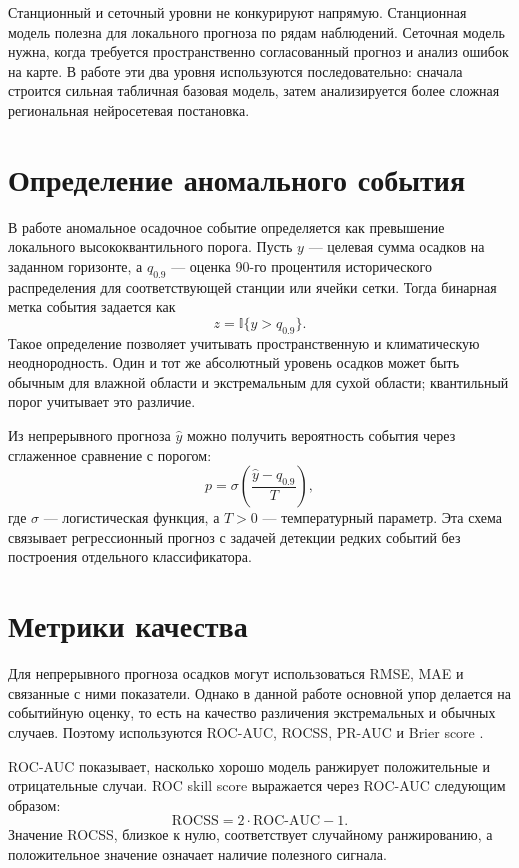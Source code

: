 Станционный и сеточный уровни не конкурируют напрямую. Станционная модель полезна для локального прогноза по рядам наблюдений. Сеточная модель нужна, когда требуется пространственно согласованный прогноз и анализ ошибок на карте. В работе эти два уровня используются последовательно: сначала строится сильная табличная базовая модель, затем анализируется более сложная региональная нейросетевая постановка.

\section{Определение аномального события}

В работе аномальное осадочное событие определяется как превышение локального высококвантильного порога. Пусть \(y\) — целевая сумма осадков на заданном горизонте, а \(q_{0.9}\) — оценка 90-го процентиля исторического распределения для соответствующей станции или ячейки сетки. Тогда бинарная метка события задается как
\[
    z = \mathbb{I}\{y > q_{0.9}\}.
\]
Такое определение позволяет учитывать пространственную и климатическую неоднородность. Один и тот же абсолютный уровень осадков может быть обычным для влажной области и экстремальным для сухой области; квантильный порог учитывает это различие.

Из непрерывного прогноза \(\hat y\) можно получить вероятность события через сглаженное сравнение с порогом:
\[
    p = \sigma\left(\frac{\hat y - q_{0.9}}{T}\right),
\]
где \(\sigma\) — логистическая функция, а \(T>0\) — температурный параметр. Эта схема связывает регрессионный прогноз с задачей детекции редких событий без построения отдельного классификатора.

\section{Метрики качества}

Для непрерывного прогноза осадков могут использоваться RMSE, MAE и связанные с ними показатели. Однако в данной работе основной упор делается на событийную оценку, то есть на качество различения экстремальных и обычных случаев. Поэтому используются ROC-AUC, ROCSS, PR-AUC и Brier score \cite{wilks2011,gneiting2007,murphy1973brier,jolliffe2012forecast}.

ROC-AUC показывает, насколько хорошо модель ранжирует положительные и отрицательные случаи. ROC skill score выражается через ROC-AUC следующим образом:
\[
    \mathrm{ROCSS} = 2\cdot \mathrm{ROC\mbox{-}AUC} - 1.
\]
Значение ROCSS, близкое к нулю, соответствует случайному ранжированию, а положительное значение означает наличие полезного сигнала.

